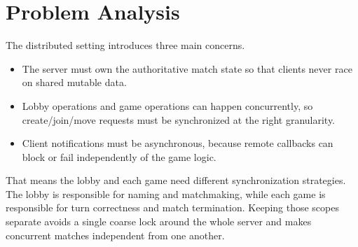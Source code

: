 \clearpage
\section{Problem Analysis}

The distributed setting introduces three main concerns.
\begin{itemize}
    \item The server must own the authoritative match state so that clients never race on shared mutable data.
    \item Lobby operations and game operations can happen concurrently, so create/join/move requests must be synchronized at the right granularity.
    \item Client notifications must be asynchronous, because remote callbacks can block or fail independently of the game logic.
\end{itemize}

That means the lobby and each game need different synchronization strategies.
The lobby is responsible for naming and matchmaking, while each game is
responsible for turn correctness and match termination. Keeping those scopes
separate avoids a single coarse lock around the whole server and makes
concurrent matches independent from one another.
